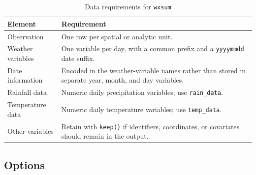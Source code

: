 \begin{table}[htbp]
\caption{Data requirements for \texttt{wxsum}}
\label{tab:datareq}
\begin{center}
\begin{tabularx}{\textwidth}{lX}
\hline
Element & Requirement \\
\hline
Observation & One row per spatial or analytic unit. \\
Weather variables & One variable per day, with a common prefix and a \texttt{yyyymmdd} date suffix. \\
Date information & Encoded in the weather-variable names rather than stored in separate year, month, and day variables. \\
Rainfall data & Numeric daily precipitation variables; use \texttt{rain\_data}. \\
Temperature data & Numeric daily temperature variables; use \texttt{temp\_data}. \\
Other variables & Retain with \texttt{keep()} if identifiers, coordinates, or covariates should remain in the output. \\
\hline
\end{tabularx}
\end{center}
\end{table}

\subsection{Options}

